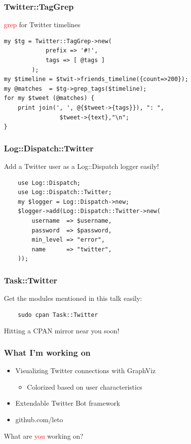 \documentclass[12pt]{beamer}
\begin{document}
\begin{frame}[fragile]
    \frametitle{Twitter::TagGrep}
    \textcolor{red}{grep} for Twitter timelines
    \begin{verbatim}
my $tg = Twitter::TagGrep->new( 
            prefix => '#!',
            tags => [ @tags ] 
        );
my $timeline = $twit->friends_timeline({count=>200});
my @matches  = $tg->grep_tags($timeline);
for my $tweet (@matches) {
    print join(', ', @{$tweet->{tags}}), ": ",
                $tweet->{text},"\n";
}
    \end{verbatim}
\end{frame}


\begin{frame}[fragile]
    \frametitle{Log::Dispatch::Twitter}
    Add a Twitter user as a Log::Dispatch logger easily!
    \begin{verbatim}
    use Log::Dispatch;
    use Log::Dispatch::Twitter;
    my $logger = Log::Dispatch->new;
    $logger->add(Log::Dispatch::Twitter->new(
        username  => $username,
        password  => $password,
        min_level => "error",
        name      => "twitter",
    ));
    \end{verbatim}
\end{frame}

\begin{frame}[fragile]
    \frametitle{Task::Twitter}
Get the modules mentioned in this talk easily:
    \begin{verbatim}
    sudo cpan Task::Twitter
    \end{verbatim}
Hitting a CPAN mirror near you soon!
\end{frame}

\begin{frame}
    \frametitle{What I'm working on}
    \begin{itemize}
    \item Visualizing Twitter connections with GraphViz
        \begin{itemize}
        \item Colorized based on user characteristics
        \end{itemize}
    \item Extendable Twitter Bot framework
    \item github.com/leto
    \end{itemize}
    What are \textcolor{red}{you} working on?

\end{frame}
\end{document}
